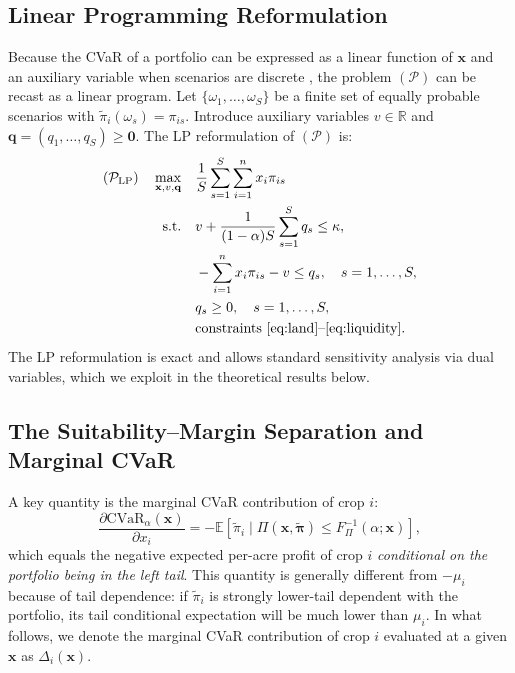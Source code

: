 \documentclass[12pt,review,authoryear]{elsarticle}
\numberwithin{equation}{section}
\begin{document}
\subsection{Linear Programming Reformulation}

Because the CVaR of a portfolio can be expressed as a linear function of
$\mathbf{x}$ and an auxiliary variable when scenarios are
discrete \citep{RockafellarUryasev2000}, the problem $(\mathcal{P})$ can
be recast as a linear program.  Let $\{\omega_1, \ldots, \omega_S\}$ be
a finite set of equally probable scenarios with $\tilde{\pi}_i(\omega_s) =
\pi_{is}$.  Introduce auxiliary variables $v \in \mathbb{R}$ and
$\mathbf{q} = (q_1, \ldots, q_S) \geq \mathbf{0}$.  The LP reformulation
of $(\mathcal{P})$ is:
\begin{align}
(\mathcal{P}_{\text{LP}})\quad
\max_{\mathbf{x}, v, \mathbf{q}} \quad &
\frac{1}{S} \sum_{s=1}^{S} \sum_{i=1}^{n} x_i \pi_{is}
\label{eq:lp_obj} \\
\text{s.t.} \quad
& v + \frac{1}{(1-\alpha)S} \sum_{s=1}^{S} q_s \leq \kappa,
\label{eq:lp_cvar} \\
& -\sum_{i=1}^{n} x_i \pi_{is} - v \leq q_s, \quad s = 1, \ldots, S,
\label{eq:lp_aux} \\
& q_s \geq 0, \quad s = 1, \ldots, S,
\label{eq:lp_q} \\
& \text{constraints } \eqref{eq:land}\text{--}\eqref{eq:liquidity}.
\nonumber
\end{align}
The LP reformulation is exact and allows standard sensitivity analysis
via dual variables, which we exploit in the theoretical results below.

\subsection{The Suitability--Margin Separation and Marginal CVaR}

A key quantity is the marginal CVaR contribution of crop $i$:
\begin{equation}
\frac{\partial \text{CVaR}_\alpha(\mathbf{x})}{\partial x_i}
= -\mathbb{E}[\tilde{\pi}_i \mid \Pi(\mathbf{x},\tilde{\boldsymbol{\pi}})\leq F_\Pi^{-1}(\alpha;\mathbf{x})],
\label{eq:margcvar}
\end{equation}
which equals the negative expected per-acre profit of crop $i$
\emph{conditional on the portfolio being in the left tail}.  This
quantity is generally different from $-\mu_i$ because of tail dependence:
if $\tilde{\pi}_i$ is strongly lower-tail dependent with the portfolio,
its tail conditional expectation will be much lower than $\mu_i$.  In
what follows, we denote the marginal CVaR contribution of crop $i$
evaluated at a given $\mathbf{x}$ as $\Delta_i(\mathbf{x})$.
\end{document}
